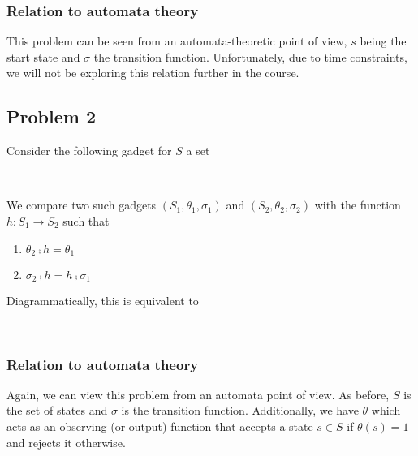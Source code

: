 \subsubsection{Relation to automata theory}

This problem can be seen from an automata-theoretic point of view, $s$ being
the start state and $\sigma$ the transition function. Unfortunately, due to
time constraints, we will not be exploring this relation further in the
course.

\subsection{Problem 2}
Consider the following gadget for $S$ a set
\begin{center}
     \\[3mm]
\end{center}
We compare two such gadgets $(S_1, \theta_1, \sigma_1)$ and $(S_2, \theta_2, \sigma_2)$
with the function $h: S_1 \to S_2$ such that
\begin{enumerate}
    \item $\theta_2 \comp h = \theta_1$
    \item $\sigma_2 \comp h = h \comp \sigma_1$
\end{enumerate}
Diagrammatically, this is equivalent to
\begin{center}
     \\[3mm]
\end{center}

\subsubsection{Relation to automata theory}
Again, we can view this problem from an automata point of view. As before, $S$
is the set of states and $\sigma$ is the transition function. Additionally, we
have $\theta$ which acts as an observing (or output) function that accepts a
state $s \in S$ if $\theta(s) = 1$ and rejects it otherwise.

